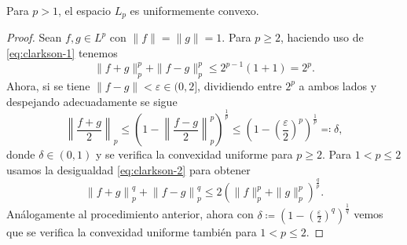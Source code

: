 \begin{corollary} \label{coro:clarkson}
    Para $ p > 1 $, el espacio $ L_p $ es uniformemente convexo.
\end{corollary}
\begin{proof}
    Sean $ f, g \in L^p $ con $ \|f\| = \|g\| = 1 $. Para $ p \geq 2 $, haciendo uso de \eqref{eq:clarkson-1} tenemos
    \begin{equation}
        \| f + g \|_p^p + \| f - g \|_p^p \leq 2^{p-1}(1 + 1) = 2^p.
    \end{equation}
    Ahora, si se tiene $\|f-g\| < \varepsilon \in (0, 2] $, dividiendo entre $ 2^p $ a ambos lados y despejando adecuadamente se sigue
    \begin{equation}
        \left\| \frac{f + g}{2} \right\|_p \leq \left( 1 - \left\| \frac{f - g}{2} \right\|_p^p\right)^{\frac{1}{p}} \leq \left( 1 - \left( \frac{\varepsilon}{2} \right)^p\right)^{\frac{1}{p}} \eqcolon \delta,
    \end{equation}
    donde $ \delta \in (0, 1) $ y se verifica la convexidad uniforme para $ p \geq 2 $. Para $ 1 < p \leq 2 $ usamos la desigualdad \eqref{eq:clarkson-2} para obtener
    \begin{equation}
        \left\| f + g \right\|_p^q + \left\| f - g \right\|_p^q \leq 2 \left(\|f \|_p^p + \|g\|_p^p \right)^{\frac{q}{p}}.
    \end{equation}
    Análogamente al procedimiento anterior, ahora con $ \delta \coloneq  \left( 1 - \left( \frac{\varepsilon}{2} \right)^q\right)^{\frac{1}{q}} $ vemos que se verifica la convexidad uniforme también para $ 1 < p \leq 2 $.
\end{proof}
